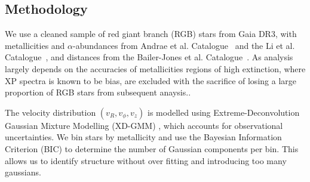 \documentclass[a4paper,10pt]{article}
\begin{document}
\begin{multicols}{2}
\subsection*{Methodology}

We use a cleaned sample of red giant branch (RGB) stars from Gaia DR3, with metallicities and $\alpha$-abundances from Andrae et 
al. Catalogue~\cite{Andrae2023} and the Li et al. Catalogue~\cite{Li2024}, and distances from the Bailer-Jones et al. 
Catalogue~\cite{BailerJones2021}. As analysis largely depends on the accuracies of metallicities regions of high extinction, 
where XP spectra is known to be bias, are excluded with the sacrifice of losing a large proportion of RGB stars from subsequent anaysis..

The velocity distribution $(v_R, v_\phi, v_z)$ is modelled using Extreme-Deconvolution Gaussian Mixture Modelling (XD-GMM) \cite{Bovy2011}\cite{pygmmis}, 
which accounts for observational uncertainties. We bin stars by metallicity and use the Bayesian Information Criterion (BIC) to determine the 
number of Gaussian components per bin. This allows us to identify structure without over fitting and introducing too many gaussians.

\begin{figure}[t]
  \centering


\end{figure}
\end{multicols}
\end{document}
